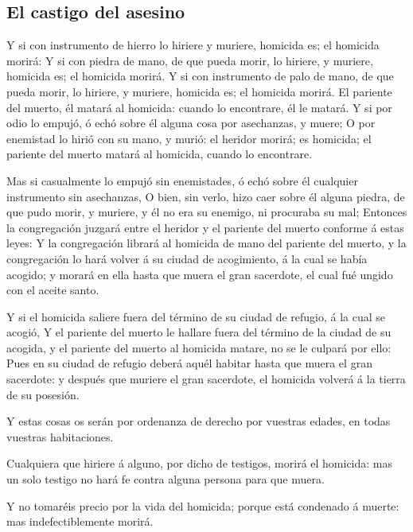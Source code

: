 \hypertarget{el-castigo-del-asesino}{%
\subsection{El castigo del asesino}\label{el-castigo-del-asesino}}

 Y si con instrumento de hierro lo hiriere y muriere,
homicida es; el homicida morirá:  Y si con piedra de mano,
de que pueda morir, lo hiriere, y muriere, homicida es; el homicida
morirá.  Y si con instrumento de palo de mano, de que pueda
morir, lo hiriere, y muriere, homicida es; el homicida morirá.
 El pariente del muerto, él matará al homicida: cuando lo
encontrare, él le matará.  Y si por odio lo empujó, ó echó
sobre él alguna cosa por asechanzas, y muere;  O por
enemistad lo hirió con su mano, y murió: el heridor morirá; es homicida;
el pariente del muerto matará al homicida, cuando lo encontrare.

 Mas si casualmente lo empujó sin enemistades, ó echó sobre
él cualquier instrumento sin asechanzas,  O bien, sin
verlo, hizo caer sobre él alguna piedra, de que pudo morir, y muriere, y
él no era su enemigo, ni procuraba su mal;  Entonces la
congregación juzgará entre el heridor y el pariente del muerto conforme
á estas leyes:  Y la congregación librará al homicida de
mano del pariente del muerto, y la congregación lo hará volver á su
ciudad de acogimiento, á la cual se había acogido; y morará en ella
hasta que muera el gran sacerdote, el cual fué ungido con el aceite
santo.

 Y si el homicida saliere fuera del término de su ciudad de
refugio, á la cual se acogió,  Y el pariente del muerto le
hallare fuera del término de la ciudad de su acogida, y el pariente del
muerto al homicida matare, no se le culpará por ello:  Pues
en su ciudad de refugio deberá aquél habitar hasta que muera el gran
sacerdote: y después que muriere el gran sacerdote, el homicida volverá
á la tierra de su posesión.

 Y estas cosas os serán por ordenanza de derecho por
vuestras edades, en todas vuestras habitaciones.

 Cualquiera que hiriere á alguno, por dicho de testigos,
morirá el homicida: mas un solo testigo no hará fe contra alguna persona
para que muera.

 Y no tomaréis precio por la vida del homicida; porque está
condenado á muerte: mas indefectiblemente morirá.

